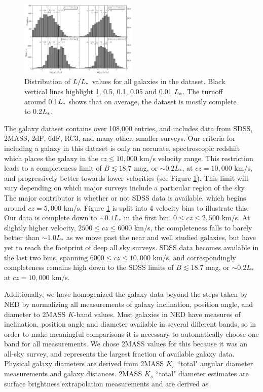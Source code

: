 \documentclass[iop]{emulateapj-rtx4}
\begin{document}
\begin{figure}[ht!]
        \centering
        \vspace{0pt}
        \includegraphics[width=0.50\textwidth]{Lstar_histogram_4bins_final_0-10000_v3.pdf}
        \caption{\small{Distribution of $L/L_{\**}$ values for all galaxies in the dataset. Black vertical lines highlight 1, 0.5, 0.1, 0.05 and 0.01 $L_{\**}$. The turnoff around 0.1$L_{\**}$ shows that on average, the dataset is mostly complete to 0.2$L_{\**}$.}}
        \label{completeness}
\end{figure} 

The galaxy dataset contains over 108,000 entries, and includes data from SDSS, 2MASS, 2dF, 6dF, RC3, and many other, smaller surveys. Our criteria for including a galaxy in this dataset is only an accurate, spectroscopic redshift which places the galaxy in the $cz \leq 10,000$ km/s velocity range. This restriction leads to a completeness limit of $B \lesssim 18.7$ mag, or $\sim0.2 L_*$, at $cz = 10,000$ km/s, and progressively better towards lower velocities (see Figure \ref{completeness}). This limit will vary depending on which major surveys include a particular region of the sky. The major contributor is whether or not SDSS data is available, which begins around $cz = 5,000$ km/s. Figure \ref{completeness} is split into 4 velocity bins to illustrate this. Our data is complete down to $\sim0.1 L_*$ in the first bin, $0 \leq cz \leq 2,500$ km/s. At slightly higher velocity, $2500 \leq cz \leq 6000$ km/s, the completeness falls to barely better than $\sim1.0 L_*$ as we move past the near and well studied galaxies, but have yet to reach the footprint of deep all sky surveys. SDSS data becomes available in the last two bins, spanning $6000 \leq cz \leq 10,000$ km/s, and correspondingly completeness remains high down to the SDSS limits of $B \lesssim 18.7$ mag, or $\sim0.2 L_*$ at $cz = 10,000$ km/s.


Additionally, we have homogenized the galaxy data beyond the steps taken by NED by normalizing all measurements of galaxy inclination, position angle, and diameter to 2MASS $K$-band values. Most galaxies in NED have measures of inclination, position angle and diameter available in several different bands, so in order to make meaningful comparisons it is necessary to automatically choose one band for all measurements. We chose 2MASS values for this because it was an all-sky survey, and represents the largest fraction of available galaxy data. Physical galaxy diameters are derived from 2MASS $K_s$ ``total" angular diameter measurements and galaxy distances. 2MASS $K_s$ ``total" diameter estimates are surface brightness extrapolation measurements and are derived as 
\end{document}
